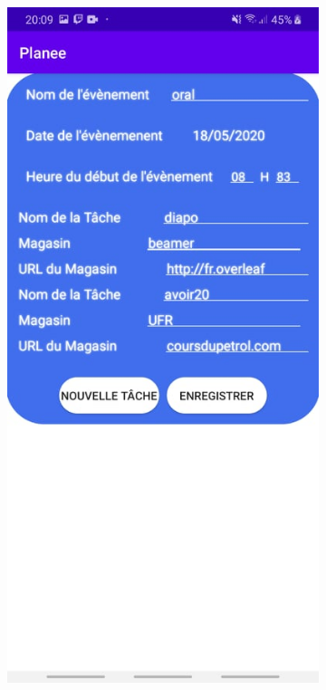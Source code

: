\documentclass[12pt,a4paper]{report}
\begin{document}
\begin{flushleft}
\begin{figure}[!h]
\begin{subfigure}[b]{0.3\textwidth}
    \end{subfigure}
    \begin{subfigure}[b]{0.3\textwidth}
        \includegraphics[width=\textwidth]{FormUpdateModif}

\end{subfigure}
\end{figure}
\end{flushleft}
\end{document}
